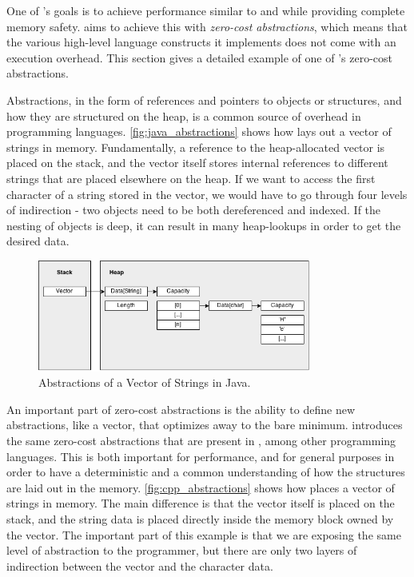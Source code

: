 One of {\rust}'s goals is to achieve performance similar to {\C} and {\Cpp} while providing complete memory safety.
{\rust} aims to achieve this with \emph{zero-cost abstractions}, which means that the various high-level language constructs it implements does not come with an execution overhead.
This section gives a detailed example of one of {\rust}'s zero-cost abstractions.

Abstractions, in the form of references and pointers to objects or structures, and how they are
structured on the heap, is a common source of overhead in programming languages.
\autoref{fig:java_abstractions} shows how {\Java} lays out a vector of
strings in memory.
Fundamentally, a reference to the heap-allocated vector is placed on the stack, and the vector itself stores internal references to different strings that are placed elsewhere on the heap.
If we want to access the first character of a string stored in the vector, we would have to go through four levels of indirection - two objects need to be both dereferenced and indexed.
If the nesting of objects is deep, it can result in many heap-lookups in order to get the desired data.

\begin{figure}[tb]
  \begin{center}
    \includegraphics[width=0.8\textwidth]{figures/java_abstractions}
  \end{center}
  \caption{Abstractions of a Vector of Strings in Java.}
  \label{fig:java_abstractions}
\end{figure}

An important part of zero-cost abstractions is the ability to define new abstractions, like a vector, that optimizes away to the bare minimum.
{\rust} introduces the same zero-cost abstractions that are present in {\Cpp}, among other programming languages.
This is both important for performance, and for general purposes in order to have a deterministic and a common understanding of how the structures are laid out in the memory.
\autoref{fig:cpp_abstractions} shows how {\Cpp} places a vector of strings in memory.
The main difference is that the vector itself is placed on the stack, and the string data is placed directly inside the memory block owned by the vector.
The important part of this example is that we are exposing the same level of abstraction to the programmer, but there are only two layers of indirection between the vector and the character data.

